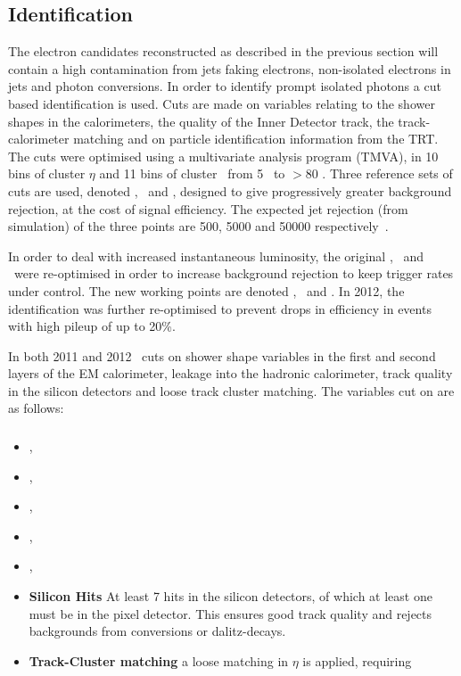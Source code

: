 \subsection{Identification}
\label{sec:reco-el-id}

The electron candidates reconstructed as described in the previous section will
contain a high contamination from jets faking electrons, non-isolated electrons
in jets and photon conversions. In order to identify prompt isolated photons a
cut based identification is used. Cuts are made on variables relating to the
shower shapes in the calorimeters, the quality of the Inner Detector track, the
track-calorimeter matching and on particle identification information from the
TRT. The cuts were optimised using a multivariate analysis program (TMVA), in 10 bins
of cluster $\eta$ and 11 bins of cluster \et\ from 5 \gev\ to $> 80$ \gev.
Three reference sets of cuts are used, denoted \loose, \medium\ and \tight,
designed to give progressively greater background rejection, at the cost of
signal efficiency. The expected jet rejection (from simulation) of the three points are 500, 5000
and 50000 respectively~\cite{ATL-PHYS-PUB-2011-006}.

In order to deal with increased instantaneous luminosity, the original \loose,
\medium\ and \tight\ were re-optimised in order to increase background rejection
to keep trigger rates under control. The new
working points are denoted \loosePP, \mediumPP\ and \tightPP. In 2012, the
identification was further re-optimised to prevent drops in efficiency in events
with high pileup of up to 20\%. 

In both 2011 and 2012 \loosePP\ cuts on shower shape variables in the first and
second layers of the EM calorimeter, leakage into the hadronic
calorimeter, track quality in the silicon detectors and loose track cluster
matching. The variables cut on are as follows:

\subsubsection{\loosePP}

\begin{itemize}
    \item \Reta, 
    \item \Rhad, 
    \item \wetatwo, 
    \item \Eratio, 
    \item \wstot, 
    \item {\bf Silicon Hits} At least 7 hits in the silicon detectors, of which at
    least one must be in the pixel detector. This ensures good track quality and
    rejects backgrounds from conversions or dalitz-decays.
    \item {\bf Track-Cluster matching} a loose matching in $\eta$ is applied,
    requiring 
\end{itemize}

